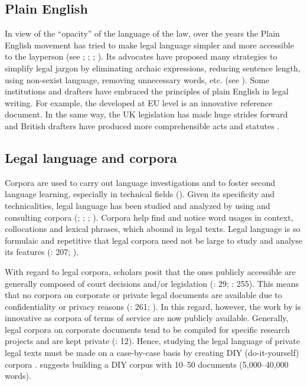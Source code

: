 \documentclass[output=paper]{langscibook}
\begin{document}
\subsection{Plain English}\label{sec:giampieri:2.2}

In view of the “opacity” \citep{Orts2015} of the language of the law, over the years the Plain English movement has tried to make legal language simpler and more accessible to the layperson (see \citealt{Tiersma1999}; \citealt{Bhatia2010}; \citealt{TiersmaSolan2012}; \citealt{Williams2023}). Its advocates have proposed many strategies to simplify legal jargon by eliminating archaic expressions, reducing sentence length, using non-sexist language, removing unnecessary words, etc. (see \citealt{Bhatia2010}). Some institutions and drafters have embraced the principles of plain English in legal writing. For example, the  \citet{EnglishStyleGuide2023} developed at EU level is an innovative reference document. In the same way, the UK legislation has made huge strides forward and British drafters have produced more comprehensible acts and statutes \citep{Williams2023}.

\subsection{Legal language and corpora}\label{sec:giampieri:2.3}

Corpora are used to carry out language investigations \citep{Resi2024} and to foster second language learning, especially in technical fields (\citealt{chapters/5-Cuchet}). Given its specificity and technicalities, legal language has been studied and analyzed by using and consulting corpora (\citealt{VigierMorenoSánchezRamos2017}; \citealt{Biel2018};  \citealt{VigierMoreno2019}; \citealt{Giampieri2024}). Corpora help find and notice word usages in context, collocations and lexical phrases, which abound in legal texts. Legal language is so formulaic and repetitive that legal corpora need not be large to study and analyse its features (\citealt{BhatiaEtAl2004}: 207; \citealt{Giampieri2025}).

With regard to legal corpora, scholars posit that the ones publicly accessible are generally composed of court decisions and/or legislation (\citealt{Biel2018}: 29;  \citealt{PrietoRamosGuzmán2021}: 255). This means that no corpora on corporate or private legal documents are available due to confidentiality or privacy reasons (\citealt{VigierMorenoSánchezRamos2017}: 261; \citealt{Biel2018}). In this regard, however, the work by \citet{Giampieri2024} is innovative as corpora of terms of service are now publicly available. Generally, legal corpora on corporate documents tend to be compiled for specific research projects and are kept private (\citealt{VogelEtAl2017}: 12). Hence, studying the legal language of private legal texts must be made on a case-by-case basis by creating DIY (do-it-yourself) corpora \citep{Zanettin2002}. \citet[244]{Zanettin2002} suggests building a DIY corpus with 10–50 documents (5,000–40,000 words).
\end{document}
